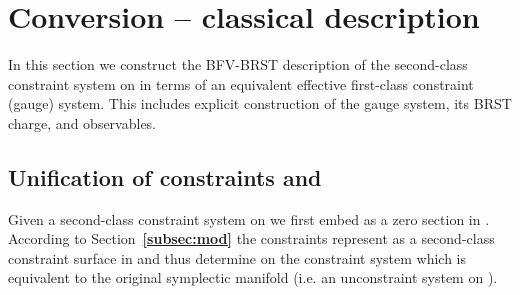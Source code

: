 \documentclass[a4paper,11pt]{amsart}
\numberwithin{thm}{section} %
\numberwithin{equation}{section} %
\numberwithin{figure}{section} %
\providecommand{\bref}[1]{{\bf \ref{#1}}}
\renewcommand{\:}{{\rm\, :\,}}
\def\mod{{\mathcal T}^*_\omega}
\def\manM{{\mathcal M}}
\begin{document}
\section{Conversion -- classical description}\label{sec:cl}
In this section we construct the BFV-BRST description of the
second-class constraint system on \myHighlight{$\manM$}\coordHE{} in terms
of an equivalent effective first-class constraint (gauge) system.
This includes explicit construction of the gauge system,
its BRST charge, and observables.


\subsection{Unification of constraints \myHighlight{$\theta_\alpha$}\coordHE{} and \coordHE{}}
Given a second-class constraint system on \myHighlight{$\manM$}\coordHE{} we first embed
\myHighlight{$\manM$}\coordHE{} as a zero section in \myHighlight{$\mod\manM$}\coordHE{}.  According to
Section~\bref{subsec:mod} the constraints
\coordHE{} represent \myHighlight{$\manM$}\coordHE{} as a second-class constraint
surface in \myHighlight{$\mod\manM$}\coordHE{} and thus determine on \myHighlight{$\mod\manM$}\coordHE{} the
constraint system which is equivalent to the original symplectic
manifold \myHighlight{$\manM$}\coordHE{} (i.e. an unconstraint system on \myHighlight{$\manM$}\coordHE{}).
\end{document}
